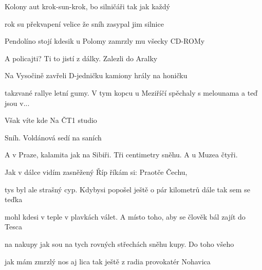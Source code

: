 \begin{song}
\bigskip

  Kolony aut  krok-sun-krok,  bo silničáři tak jak každý \par
{}rok su překvapení velice že sníh zasypal jim silnice  \par

\bigskip

 Pendolíno stojí kdesik  u Polomy  zamrzly mu všecky CD-ROMy \par
{} A policajti?  Ti to jistí z dálky.   Zalezli do Aralky \par

\bigskip

\Refren

\bigskip

 Na Vysočině zavřeli  D-jedničku  kamiony hrály na honičku \par
{} takzvané rallye letní gumy.  V tym kopcu u Meziříčí spěchaly s melounama a teď jsou v... \par

\bigskip

 Však víte kde    Na ČT1 studio \par
{}Sníh.  Voldánová sedí  na saních  \par
{} A v Praze, kalamita jak na Sibiři.  Tři centimetry sněhu.  A u Muzea čtyři. \par

\bigskip

   Jak v dálce vidím zasněžený Říp říkám si: Praotče Čechu, \par
{}tys byl ale strašný cyp.  Kdybysi popošel ještě o pár kilometrů dále  tak sem se teďka \par
{}mohl kdesi v teple v plavkách válet.  A místo toho,  aby se člověk bál zajít do Tesca \par
{}na nakupy  jak sou na tych rovných střechách  sněhu kupy.  Do toho všeho \par
{} jak mám  zmrzlý nos aj lica tak ještě  z radia  provokatér Nohavica \par

\bigskip

\Refren \par
{}

\end{song}
